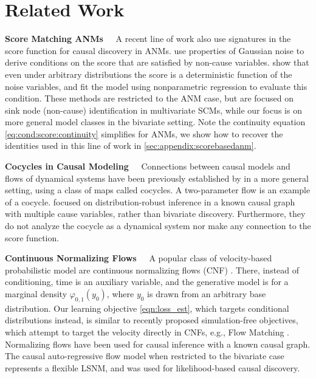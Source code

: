 \section{Related Work}
\label{sec:related}

\textbf{Score Matching ANMs\ \ } A recent line of work also use signatures in the score function for causal discovery in ANMs. \citep{rolland2022score, montagna2023scalable} use properties of Gaussian noise to derive conditions on the score that are satisfied by non-cause variables. \citep{montagna2023causal} show that even under arbitrary distributions the score is a deterministic function of the noise variables, and fit the model using nonparametric regression to evaluate this condition. These methods are restricted to the ANM case, but are focused on sink node (non-cause) identification in multivariate SCMs, while our focus is on more general model classes in the bivariate setting. Note the continuity equation \eqref{eq:cond:score:continuity} simplifies for ANMs, we show how to recover the identities used in this line of work in \cref{sec:appendix:scorebasedanm}.

\textbf{Cocycles in Causal Modeling\ \ }
Connections between causal models and flows of dynamical systems have been previously established by \citet{dance2024causal} in a more general setting, using a class of maps called cocycles. A two-parameter flow is an example of a cocycle. \citet{dance2024causal} focused on distribution-robust inference in a known causal graph with multiple cause variables, rather than bivariate discovery. Furthermore, they do not analyze the cocycle as a dynamical system nor make any connection to the score function.  

\textbf{Continuous Normalizing Flows\ \ } A popular class of velocity-based probabilistic model are  continuous normalizing flows (CNF) \citep{chen2018neural}. There, instead of conditioning, time is an auxiliary variable, and the generative model is for a marginal density $\varphi_{0,1}(y_0)$, where $y_0$ is drawn from an arbitrary base distribution. Our learning objective \eqref{eqn:loss_est}, which targets conditional distributions instead, is similar to recently proposed simulation-free objectives, which attempt to target the velocity directly in CNFs, e.g., Flow Matching \citep{lipman2023flow}. Normalizing flows have been used for causal inference \citep{khemakhem21a_carfl,javaloy2024causal} with a known causal graph. The causal auto-regressive flow model \citep{khemakhem21a_carfl} when restricted to the bivariate case represents a flexible LSNM, and was used for likelihood-based causal discovery.


